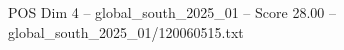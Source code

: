 \begin{textsample}{POS Dim 4 – global\_south\_2025\_01 – Score 28.00 – global\_south\_2025\_01/120060515.txt}
\end{textsample}
